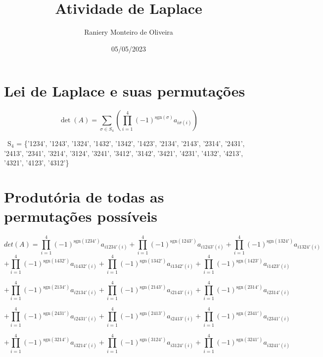 \documentclass{article}
\title{Atividade de Laplace}
\author{Raniery Monteiro de Oliveira}
\date{05/05/2023}
\begin{document}
    \maketitle
    \section{Lei de Laplace e suas permutações}
    
    
    \[
    \det(A) = \sum_{\sigma \in S_4} \left( \prod_{i=1}^{4} (-1)^{\mathrm{sgn}(\sigma)} a_{i\sigma(i)} \right)
    \] \newline
    
    \ {S}$_4$ = \{'1234', '1243', '1324', '1432', '1342', '1423', 
    '2134', '2143', '2314', '2431', '2413', '2341', 
    '3214', '3124', '3241', '3412', '3142', '3421', 
    '4231', '4132', '4213', '4321', '4123', '4312'\} \newline
    
    \section{Produtória de todas as permutações possíveis}
    
    \[
    det(A)=
    \prod_{i=1}^{4} (-1)^{\mathrm{sgn}(1234')} a_{i1234'(i)} 
    + \prod_{i=1}^{4} (-1)^{\mathrm{sgn}(1243')} a_{i1243'(i)} 
    + \prod_{i=1}^{4} (-1)^{\mathrm{sgn}(1324')} a_{i1324'(i)} 
    \]\newline
    \[
    + \prod_{i=1}^{4} (-1)^{\mathrm{sgn}(1432')} a_{i1432'(i)} 
    + \prod_{i=1}^{4} (-1)^{\mathrm{sgn}(1342')} a_{i1342'(i)} 
    + \prod_{i=1}^{4} (-1)^{\mathrm{sgn}(1423')} a_{i1423'(i)}
    \]\newline
    
    \[
    + \prod_{i=1}^{4} (-1)^{\mathrm{sgn}(2134')} a_{i2134'(i)} 
    + \prod_{i=1}^{4} (-1)^{\mathrm{sgn}(2143')} a_{i2143'(i)} 
    + \prod_{i=1}^{4} (-1)^{\mathrm{sgn}(2314')} a_{i2314'(i)} 
    \]\newline
    
    \[
    + \prod_{i=1}^{4} (-1)^{\mathrm{sgn}(2431')} a_{i2431'(i)} 
    + \prod_{i=1}^{4} (-1)^{\mathrm{sgn}(2413')} a_{i2413'(i)} 
    + \prod_{i=1}^{4} (-1)^{\mathrm{sgn}(2341')} a_{i2341'(i)} 
    \]\newline
    
    \[
    + \prod_{i=1}^{4} (-1)^{\mathrm{sgn}(3214')} a_{i3214'(i)} 
    + \prod_{i=1}^{4} (-1)^{\mathrm{sgn}(3124')} a_{i3124'(i)} 
    + \prod_{i=1}^{4} (-1)^{\mathrm{sgn}(3241')} a_{i3241'(i)} 
    \]\newline
    
\end{document}
